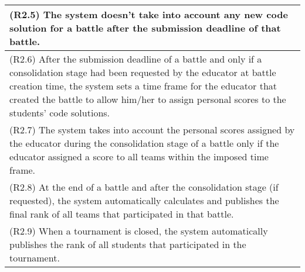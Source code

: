 \begin{longtable}{|p{16.5cm}|}
(R2.5) The system doesn't take into account any new code solution for a battle after the submission deadline of that battle.  \\
\hline
(R2.6) After the submission deadline of a battle and only if a consolidation stage had been requested by the educator at battle creation time, the system sets a time frame for the educator that created the battle to allow him/her to assign personal scores to the students’ code solutions.  \\
\hline
(R2.7) The system takes into account the personal scores assigned by the educator during the consolidation stage of a battle only if the educator assigned a score to all teams within the imposed time frame. \\
\hline
(R2.8) At the end of a battle and after the consolidation stage (if requested), the system automatically calculates and publishes the final rank of all teams that participated in that battle.  \\
\hline
(R2.9) When a tournament is closed, the system automatically publishes the rank of all students that participated in the tournament. \\
\hline

\end{longtable}

